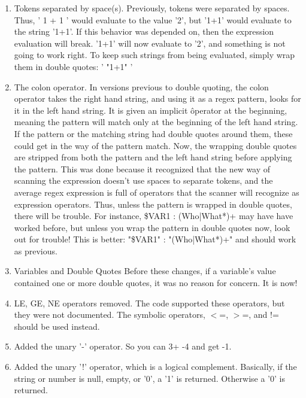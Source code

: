 \begin{enumerate}
\item Tokens separated by space(s).
   Previously, tokens were separated by spaces. Thus, ' 1 + 1 ' would evaluate
   to the value '2', but '1+1' would evaluate to the string '1+1'. If this
   behavior was depended on, then the expression evaluation will break. '1+1'
   will now evaluate to '2', and something is not going to work right.
   To keep such strings from being evaluated, simply wrap them in double 
   quotes: '  "1+1" '

\item The colon operator. In versions previous to double quoting, the
   colon operator takes the right hand string, and using it as a 
   regex pattern, looks for it in the left hand string. It is given
   an implicit \^ operator at the beginning, meaning the pattern 
   will match only at the beginning of the left hand string. 
   If the pattern or the matching string had double quotes around
   them, these could get in the way of the pattern match. Now,
   the wrapping double quotes are stripped from both the pattern 
   and the left hand string before applying the pattern. This
   was done because it recognized that the new way of
   scanning the expression doesn't use spaces to separate tokens,
   and the average regex expression is full of operators that 
   the scanner will recognize as expression operators. Thus, unless
   the pattern is wrapped in double quotes, there will be trouble.
   For instance,      \${VAR1} : (Who|What*)+
   may have have worked before, but unless you wrap the pattern
   in double quotes now, look out for trouble! This is better:
         "\${VAR1}" : "(Who|What*)+"
   and should work as previous.

\item Variables and Double Quotes
   Before these changes, if a variable's value contained one or more double
   quotes, it was no reason for concern. It is now!

\item LE, GE, NE operators removed. The code supported these operators,
   but they were not documented. The symbolic operators, $<$=, $>$=, and !=
   should be used instead.

\item  Added the unary '-' operator. So you can 3+ -4 and get -1.

\item  Added the unary '!' operator, which is a logical complement.
    Basically, if the string or number is null, empty, or '0',
    a '1' is returned. Otherwise a '0' is returned.


\end{enumerate}
